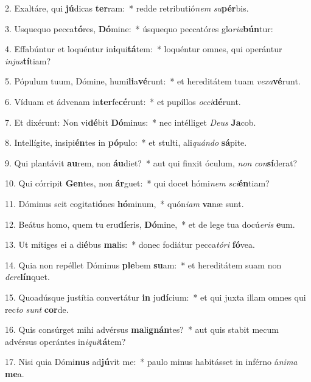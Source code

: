 2. Exaltáre, qui \textbf{jú}dicas \textbf{ter}ram:~*  redde retributió\textit{nem} \textit{su}\textbf{pér}bis.\

3. Usquequo pecca\textbf{tó}res, \textbf{Dó}mine:~*  úsquequo peccatóres glo\textit{ri}\textit{a}\textbf{bún}tur:\

4. Effabúntur et loquéntur in\textbf{i}qui\textbf{tá}tem:~*  loquéntur omnes, qui operántur \textit{in}\textit{jus}\textbf{tí}tiam?\

5. Pópulum tuum, Dómine, humi\textbf{li}a\textbf{vé}runt:~*  et hereditátem tuam \textit{ve}\textit{xa}\textbf{vé}runt.\

6. Víduam et ádvenam in\textbf{ter}fe\textbf{cé}runt:~*  et pupíllos \textit{oc}\textit{ci}\textbf{dé}runt.\

7. Et dixérunt: Non vi\textbf{dé}bit \textbf{Dó}minus:~*  nec intélliget \textit{De}\textit{us} \textbf{Ja}cob.\

8. Intellígite, insipi\textbf{én}tes in \textbf{pó}pulo:~*  et stulti, ali\textit{quán}\textit{do} \textbf{sá}pite.\

9. Qui plantávit \textbf{au}rem, non \textbf{áu}diet?~*  aut qui finxit óculum, \textit{non} \textit{con}\textbf{sí}derat?\

10. Qui córripit \textbf{Gen}tes, non \textbf{ár}guet:~*  qui docet hómi\textit{nem} \textit{sci}\textbf{én}tiam?\

11. Dóminus scit cogitati\textbf{ó}nes \textbf{hó}minum,~*  quón\textit{i}\textit{am} \textbf{va}næ sunt.\

12. Beátus homo, quem tu eru\textbf{dí}eris, \textbf{Dó}mine,~*  et de lege tua docú\textit{e}\textit{ris} \textbf{e}um.\

13. Ut mítiges ei a di\textbf{é}bus \textbf{ma}lis:~*  donec fodiátur pecca\textit{tó}\textit{ri} \textbf{fó}vea.\

14. Quia non repéllet Dóminus \textbf{ple}bem \textbf{su}am:~*  et hereditátem suam non \textit{de}\textit{re}\textbf{lín}quet.\

15. Quoadúsque justítia convertátur \textbf{in} ju\textbf{dí}cium:~*  et qui juxta illam omnes qui rec\textit{to} \textit{sunt} \textbf{cor}de.\

16. Quis consúrget mihi advérsus \textbf{ma}li\textbf{gnán}tes?~*  aut quis stabit mecum advérsus operántes in\textit{i}\textit{qui}\textbf{tá}tem?\

17. Nisi quia Dómi\textbf{nus} ad\textbf{jú}vit me:~*  paulo minus habitásset in inférno á\textit{ni}\textit{ma} \textbf{me}a.\

